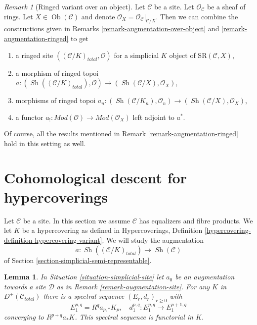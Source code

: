 \documentclass[10pt,a4paper]{amsart}
\theoremstyle{plain}
\newtheorem{lemma}[subsection]{Lemma}
\theoremstyle{definition}
\theoremstyle{remark}
\newtheorem{remark}[subsection]{Remark}
\numberwithin{equation}{subsection}
\def\Ob{\mathop{\mathrm{Ob}}\nolimits}
\def\Sh{\mathop{\mathit{Sh}}\nolimits}
\begin{document}
\begin{remark}[Ringed variant over an object]
\label{remark-augmentation-ringed-over-object}
Let $\mathcal{C}$ be a site. Let $\mathcal{O}_\mathcal{C}$ be a sheaf of rings.
Let $X \in \Ob(\mathcal{C})$ and denote
$\mathcal{O}_X = \mathcal{O}_\mathcal{C}|_{\mathcal{C}/X}$.
Then we can combine the constructions given in
Remarks \ref{remark-augmentation-over-object} and
\ref{remark-augmentation-ringed}
to get
\begin{enumerate}
\item a ringed site $((\mathcal{C}/K)_{total}, \mathcal{O})$
for a simplicial $K$ object of $\text{SR}(\mathcal{C}, X)$,
\item a morphism of ringed topoi
$a : (\Sh((\mathcal{C}/K)_{total}), \mathcal{O}) \to
(\Sh(\mathcal{C}/X), \mathcal{O}_X)$,
\item morphisms of ringed topoi
$a_n : (\Sh(\mathcal{C}/K_n), \mathcal{O}_n) \to
(\Sh(\mathcal{C}/X), \mathcal{O}_X)$,
\item a functor
$a_! : \textit{Mod}(\mathcal{O}) \to \textit{Mod}(\mathcal{O}_X)$
left adjoint to $a^*$.
\end{enumerate}
Of course, all the results mentioned in
Remark \ref{remark-augmentation-ringed}
hold in this setting as well.
\end{remark}






\section{Cohomological descent for hypercoverings}
\label{section-cohomological-descent-hypercoverings}

\noindent
Let $\mathcal{C}$ be a site. In this section we assume $\mathcal{C}$
has equalizers and fibre products. We let $K$ be a hypercovering
as defined in Hypercoverings, Definition
\ref{hypercovering-definition-hypercovering-variant}. We will study
the augmentation
$$
a : \Sh((\mathcal{C}/K)_{total}) \longrightarrow \Sh(\mathcal{C})
$$
of Section \ref{section-simplicial-semi-representable}.

\begin{lemma}
\label{lemma-augmentation-spectral-sequence}
In Situation \ref{situation-simplicial-site} let
$a_0$ be an augmentation towards a site $\mathcal{D}$
as in Remark \ref{remark-augmentation-site}.
For any $K$ in $D^+(\mathcal{C}_{total})$ there is a spectral
sequence 
$(E_r, d_r)_{r \geq 0}$ with
$$
E_1^{p, q} = R^qa_{p, *} K_p,\quad
d_1^{p, q} : E_1^{p, q} \to E_1^{p + 1, q}
$$
converging to $R^{p + q}a_*K$. This spectral sequence is functorial in $K$.
\end{lemma}
\end{document}
